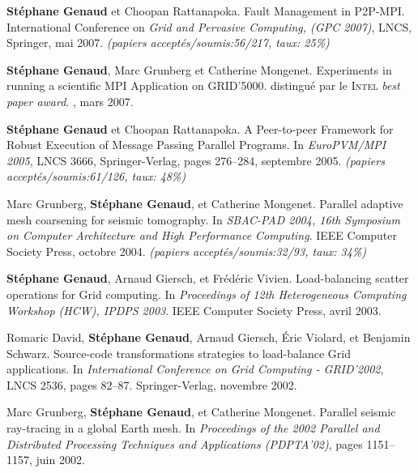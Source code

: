 \documentclass[11pt]{article}
\newcommand{\pmpi}{\mbox{\textsc{P2P-MPI}}}
\begin{document}
\begin{thebibliography}{99}
\newblock \textbf{Stéphane Genaud} et Choopan Rattanapoka.
\newblock Fault Management in {\pmpi}. 
\newblock International Conference on {\em Grid and Pervasive Computing, 
(GPC 2007)}, LNCS, Springer, mai 2007.
\newblock \small{\textit{(papiers acceptés/soumis:56/217, taux: 25\%)}}

\newblock \textbf{Stéphane Genaud}, Marc Grunberg et Catherine Mongenet.
\newblock Experiments in running a scientific {MPI} Application on GRID'5000. 
\newblock distingué par le \textsc{Intel} \textit{best paper award}.
, mars 2007.


\textbf{Stéphane Genaud} et Choopan Rattanapoka.
\newblock A Peer-to-peer Framework for Robust Execution of Message Passing 
Parallel Programs.
\newblock 
In {\em EuroPVM/MPI 2005}, LNCS 3666, Springer-Verlag, pages 276--284, 
septembre 2005.
\newblock \small{\textit{(papiers acceptés/soumis:61/126, taux: 48\%)}}


Marc Grunberg, \textbf{Stéphane Genaud}, et Catherine Mongenet.
\newblock Parallel adaptive mesh coarsening for seismic tomography.
\newblock In {\em SBAC-PAD 2004, 16th Symposium on Computer Architecture and
  High Performance Computing}. IEEE Computer Society Press, octobre 2004.
\newblock \small{\textit{(papiers acceptés/soumis:32/93, taux: 34\%)}}

\textbf{Stéphane Genaud}, Arnaud Giersch, et Frédéric Vivien.
\newblock Load-balancing scatter operations for Grid computing.
\newblock In {\em Proceedings of 12th Heterogeneous Computing Workshop 
(HCW), IPDPS 2003}. IEEE Computer Society Press, avril 2003.

Romaric David, \textbf{Stéphane Genaud}, Arnaud Giersch, \'{E}ric Violard, et 
  Benjamin Schwarz.
\newblock Source-code transformations strategies to load-balance Grid
  applications.
\newblock In {\em International Conference on Grid Computing - GRID'2002}, 
LNCS 2536, pages 82--87. Springer-Verlag, novembre 2002.

Marc Grunberg, \textbf{Stéphane Genaud}, et Catherine Mongenet.
\newblock Parallel seismic ray-tracing in a global {E}arth mesh.
\newblock In {\em Proceedings of the 2002 Parallel and Distributed Processing
  Techniques and Applications (PDPTA'02)}, pages 1151--1157, juin 2002.


\end{thebibliography}
\end{document}
